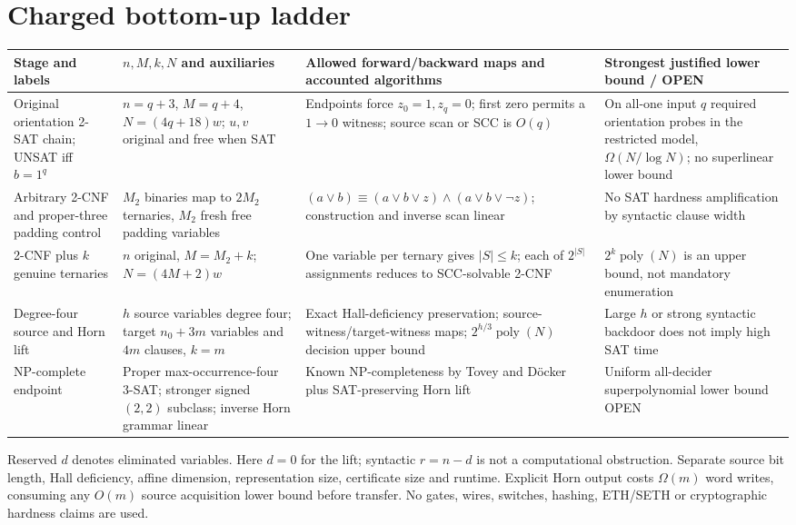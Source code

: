 \documentclass[11pt]{article}
\begin{document}
\section{Charged bottom-up ladder}
\small
\begin{longtable}{p{.23\linewidth}p{.22\linewidth}p{.25\linewidth}p{.23\linewidth}}
\toprule
Stage and labels & $n,M,k,N$ and auxiliaries & Allowed forward/backward maps and accounted algorithms & Strongest justified lower bound / OPEN\\\midrule\endhead
Original orientation 2-SAT chain; UNSAT iff $b=1^q$ & $n=q+3$, $M=q+4$, $N=(4q+18)w$; $u,v$ original and free when SAT & Endpoints force $z_0=1,z_q=0$; first zero permits a $1\to0$ witness; source scan or SCC is $O(q)$ & On all-one input $q$ required orientation probes in the restricted model, $\Omega(N/\log N)$; no superlinear lower bound\\
Arbitrary 2-CNF and proper-three padding control & $M_2$ binaries map to $2M_2$ ternaries, $M_2$ fresh free padding variables & $(a\vee b)\equiv(a\vee b\vee z)\wedge(a\vee b\vee\neg z)$; construction and inverse scan linear & No SAT hardness amplification by syntactic clause width\\
2-CNF plus $k$ genuine ternaries & $n$ original, $M=M_2+k$; $N=(4M+2)w$ & One variable per ternary gives $|S|\le k$; each of $2^{|S|}$ assignments reduces to SCC-solvable 2-CNF & $2^k\operatorname{poly}(N)$ is an upper bound, not mandatory enumeration\\
Degree-four source and Horn lift & $h$ source variables degree four; target $n_0+3m$ variables and $4m$ clauses, $k=m$ & Exact Hall-deficiency preservation; source-witness/target-witness maps; $2^{h/3}\operatorname{poly}(N)$ decision upper bound & Large $h$ or strong syntactic backdoor does not imply high SAT time\\
NP-complete endpoint & Proper max-occurrence-four 3-SAT; stronger signed $(2,2)$ subclass; inverse Horn grammar linear & Known NP-completeness by Tovey and D\"ocker plus SAT-preserving Horn lift & Uniform all-decider superpolynomial lower bound OPEN\\
\bottomrule
\end{longtable}\normalsize
Reserved $d$ denotes eliminated variables. Here $d=0$ for the lift; syntactic $r=n-d$ is not a computational obstruction. Separate source bit length, Hall deficiency, affine dimension, representation size, certificate size and runtime. Explicit Horn output costs $\Omega(m)$ word writes, consuming any $O(m)$ source acquisition lower bound before transfer. No gates, wires, switches, hashing, ETH/SETH or cryptographic hardness claims are used.
\end{document}

